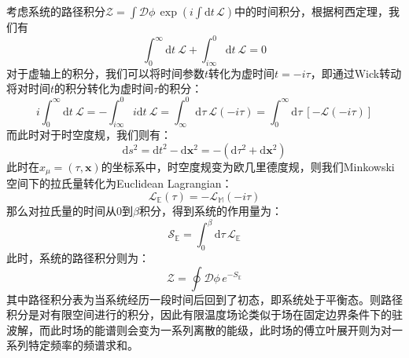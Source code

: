 考虑系统的路径积分$\mathcal{Z}=\int \mathcal{D}\phi\,\exp(i\int\mathrm{d}t\,\mathcal{L})$中的时间积分，根据柯西定理，我们有
\begin{equation}
    \int_{0}^{\infty} \mathrm{d}t ~\mathcal{L} + \int_{i\infty}^0\mathrm{d}t ~\mathcal{L} = 0
\end{equation}
对于虚轴上的积分，我们可以将时间参数$t$转化为虚时间$t=-i\tau$，即通过Wick转动将对时间$t$的积分转化为虚时间$\tau$的积分：
\begin{equation}
    i\int_{0}^{\infty} \mathrm{d}t ~\mathcal{L} = - \int_{i\infty}^0 i\mathrm{d}t ~\mathcal{L} =  \int_{\infty}^0\mathrm{d}\tau ~\mathcal{L}(-i\tau) = \int_0^\infty \mathrm{d}\tau ~ [-\mathcal{L}(-i\tau)]
\end{equation}
而此时对于时空度规，我们则有：
\begin{equation}
    \mathrm{d}s^2 = \mathrm{d}t^2 - \mathrm{d}\boldsymbol{x}^2 = -(\mathrm{d}\tau^2 + \mathrm{d}\boldsymbol{x}^2)
\end{equation}
此时在$x_\mu=(\tau,\boldsymbol{x})$的坐标系中，时空度规变为欧几里德度规，则我们Minkowski空间下的拉氏量转化为Euclidean Lagrangian：
\begin{equation}
    \mathcal{L}_{\mathbb{E}} (\tau)= -\mathcal{L}_{\mathbb{M}}(-i\tau)
\end{equation}
那么对拉氏量的时间从$0$到$\beta$积分，得到系统的作用量为：
\begin{equation}
    \mathcal{S}_{\mathbb{E}} = \int_0^{\beta} \mathrm{d} \tau \,\mathcal{L}_{\mathbb{E}}
\end{equation}
此时，系统的路径积分则为：
\begin{equation}
    \mathcal{Z}=\oint\mathcal{D}\phi\, e^{-S_{\mathbb{E}}}
\end{equation}
其中路径积分表为当系统经历一段时间后回到了初态，即系统处于平衡态。则路径积分是对有限空间进行的积分，因此有限温度场论类似于场在固定边界条件下的驻波解，而此时场的能谱则会变为一系列离散的能级，此时场的傅立叶展开则为对一系列特定频率的频谱求和。

